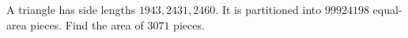 A triangle has side lengths $1943,2431,2460$. It is partitioned into $99924198$ equal-area pieces. Find the area of $3071$ pieces.
